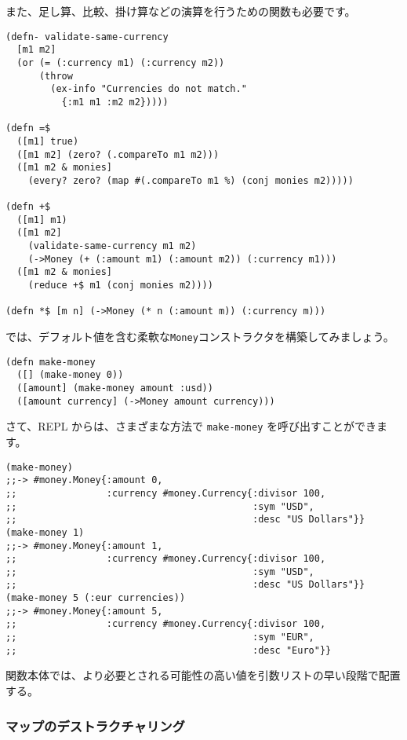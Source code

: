 また、足し算、比較、掛け算などの演算を行うための関数も必要です。

\begin{lstlisting}[numbers=none]
(defn- validate-same-currency
  [m1 m2]
  (or (= (:currency m1) (:currency m2))
      (throw
        (ex-info "Currencies do not match."
          {:m1 m1 :m2 m2}))))

(defn =$
  ([m1] true)
  ([m1 m2] (zero? (.compareTo m1 m2)))
  ([m1 m2 & monies]
    (every? zero? (map #(.compareTo m1 %) (conj monies m2)))))

(defn +$
  ([m1] m1)
  ([m1 m2]
    (validate-same-currency m1 m2)
    (->Money (+ (:amount m1) (:amount m2)) (:currency m1)))
  ([m1 m2 & monies]
    (reduce +$ m1 (conj monies m2))))

(defn *$ [m n] (->Money (* n (:amount m)) (:currency m)))
\end{lstlisting}

では、デフォルト値を含む柔軟な\texttt{Money}コンストラクタを構築してみましょう。



\begin{lstlisting}[numbers=none]
(defn make-money
  ([] (make-money 0))
  ([amount] (make-money amount :usd))
  ([amount currency] (->Money amount currency)))
\end{lstlisting}

さて、REPL からは、さまざまな方法で \texttt{make-money} を呼び出すことができます。



\begin{lstlisting}[numbers=none]
(make-money)
;;-> #money.Money{:amount 0,
;;                :currency #money.Currency{:divisor 100,
;;                                          :sym "USD",
;;                                          :desc "US Dollars"}}
(make-money 1)
;;-> #money.Money{:amount 1,
;;                :currency #money.Currency{:divisor 100,
;;                                          :sym "USD",
;;                                          :desc "US Dollars"}}
(make-money 5 (:eur currencies))
;;-> #money.Money{:amount 5,
;;                :currency #money.Currency{:divisor 100,
;;                                          :sym "EUR",
;;                                          :desc "Euro"}}
\end{lstlisting}

関数本体では、より必要とされる可能性の高い値を引数リストの早い段階で配置する。

\subsubsection{マップのデストラクチャリング}


